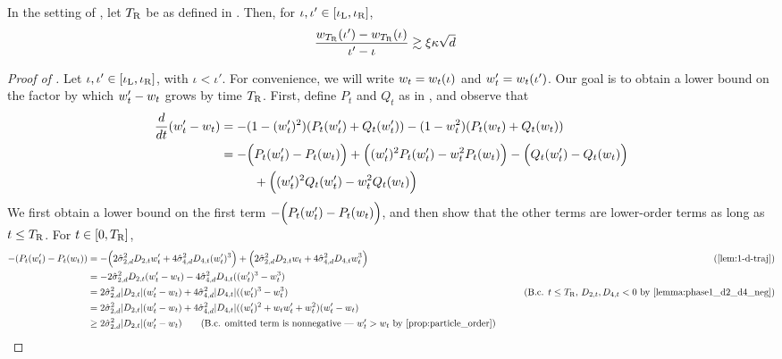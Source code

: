 \begin{lemma} \label{lemma:w_diff_growth}
In the setting of , let ${T_{\textup{R}}}$ be as defined in . Then, for $\iota, \iota' \in [\iota_{\textup{L}}, \iota_{\textup{R}}]$,
\begin{align}
\frac{w_{{T_{\textup{R}}}}(\iota') - w_{{T_{\textup{R}}}}(\iota)}{\iota' - \iota}
& \gtrsim \xi \kappa \sqrt{d}
\end{align}
\end{lemma}
\begin{proof}[Proof of ]
Let $\iota, \iota' \in [\iota_{\textup{L}}, \iota_{\textup{R}}]$, with $\iota < \iota'$. For convenience, we will write $w_t = w_t(\iota)$ and $w_t' = w_t(\iota')$. Our goal is to obtain a lower bound on the factor by which $w_t' - w_t$ grows by time ${T_{\textup{R}}}$. First, define $P_t$ and $Q_t$ as in , and observe that
\begin{align}
\frac{d}{dt}(w_t' - w_t)
& = -(1 - (w_t')^2)(P_t(w_t') + Q_t(w_t')) - (1 - w_t^2)(P_t(w_t) + Q_t(w_t)) \\
& = -\Big(P_t(w_t') - P_t(w_t)\Big) + \Big((w_t')^2 P_t(w_t') - w_t^2 P_t(w_t)\Big) - \Big(Q_t(w_t') - Q_t(w_t)\Big) \\
& \,\,\,\,\,\,\,\,\,\,\,\,\,\,\,\, + \Big( (w_t')^2 Q_t(w_t') - w_t^2 Q_t(w_t)\Big) \label{eq:diff_derivative_decomposition}
\end{align}
We first obtain a lower bound on the first term $-\Big(P_t(w_t') - P_t(w_t)\Big)$, and then show that the other terms are lower-order terms as long as $t \leq {T_{\textup{R}}}$. For $t \in [0, {T_{\textup{R}}}]$,
\begin{align}
-(P_t(\w_t') - P_t(\w_t))
& = -\Big(2 \sigmaCoeffTwo^2 D_{2, t} \w_t' + 4 \sigmaCoeffFour^2 D_{4, t} (\w_t')^3 \Big) + \Big(2 \sigmaCoeffTwo^2 D_{2, t} \w_t + 4 \sigmaCoeffFour^2 D_{4, t} \w_t^3 \Big)
& \tag{\Cref{lem:1-d-traj}} \\
& = -2 \sigmaCoeffTwo^2 D_{2, t} (\w_t' - \w_t) - 4 \sigmaCoeffFour^2 D_{4, t} ((\w_t')^3 - \w_t^3) \\
& = 2 \sigmaCoeffTwo^2 |D_{2, t}| (\w_t' - \w_t) + 4 \sigmaCoeffFour^2 |D_{4, t}| ((\w_t')^3 - \w_t^3)
& \tag{B.c. $t \leq \TR$, $D_{2, t}, D_{4, t} < 0$ by \Cref{lemma:phase1_d2_d4_neg}} \\
& = 2 \sigmaCoeffTwo^2 |D_{2, t}| (\w_t' - \w_t) + 4 \sigmaCoeffFour^2 |D_{4, t}| ((\w_t')^2 + \w_t \w_t' + \w_t^2) (\w_t' - \w_t) \\
& \geq 2\sigmaCoeffTwo^2 |D_{2, t}| (\w_t' - \w_t)
\tag{B.c. omitted term is nonnegative --- $\w_t' > \w_t$ by \Cref{prop:particle_order}}

\end{align}
\end{proof}

